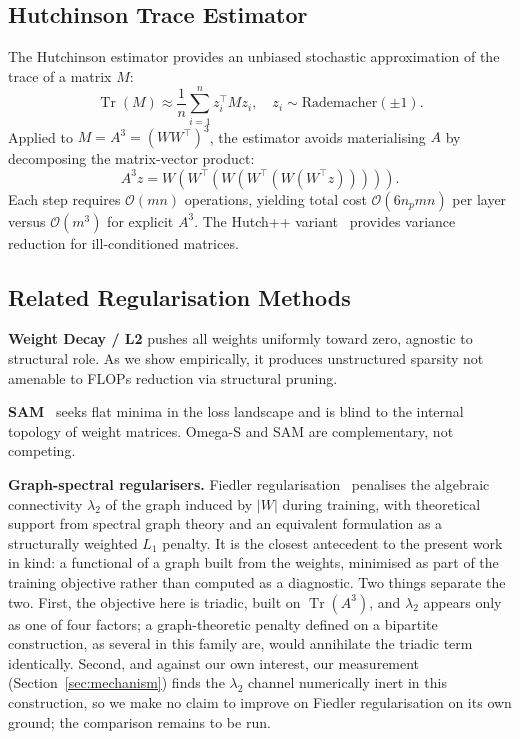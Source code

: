 \documentclass[11pt,a4paper]{article}
\begin{document}
\subsection{Hutchinson Trace Estimator}

The Hutchinson estimator provides an unbiased stochastic approximation of
the trace of a matrix $M$:
\begin{equation}
  \operatorname{Tr}(M) \approx \frac{1}{n} \sum_{i=1}^{n}
  z_i^\top M z_i, \quad z_i \sim \text{Rademacher}(\pm 1).
\end{equation}
Applied to $M = A^3 = (WW^\top)^3$, the estimator avoids materialising
$A$ by decomposing the matrix-vector product:
\begin{equation}
  A^3 z = W\!\left(W^\top\!\left(W\!\left(W^\top\!\left(
  W(W^\top z)\right)\right)\right)\right).
\end{equation}
Each step requires $\mathcal{O}(mn)$ operations, yielding total cost
$\mathcal{O}(6 n_p m n)$ per layer versus $\mathcal{O}(m^3)$ for
explicit $A^3$. The Hutch++ variant~\cite{meyer2021} provides variance
reduction for ill-conditioned matrices.

\subsection{Related Regularisation Methods}

\textbf{Weight Decay / L2} pushes all weights uniformly toward zero,
agnostic to structural role. As we show empirically, it produces
unstructured sparsity not amenable to FLOPs reduction via structural
pruning.

\textbf{SAM}~\cite{foret2021} seeks flat minima in the loss landscape and
is blind to the internal topology of weight matrices. Omega-S and SAM are
complementary, not competing.

\textbf{Graph-spectral regularisers.} Fiedler
regularisation~\cite{tam2020} penalises the algebraic connectivity
$\lambda_2$ of the graph induced by $|W|$ during training, with theoretical
support from spectral graph theory and an equivalent formulation as a
structurally weighted $L_1$ penalty. It is the closest antecedent to the
present work in kind: a functional of a graph built from the weights,
minimised as part of the training objective rather than computed as a
diagnostic. Two things separate the two. First, the objective here is
triadic, built on $\operatorname{Tr}(A^3)$, and $\lambda_2$ appears only as
one of four factors; a graph-theoretic penalty defined on a bipartite
construction, as several in this family are, would annihilate the triadic
term identically. Second, and against our own interest, our measurement
(Section~\ref{sec:mechanism}) finds the $\lambda_2$ channel numerically
inert in this construction, so we make no claim to improve on Fiedler
regularisation on its own ground; the comparison remains to be run.
\end{document}
